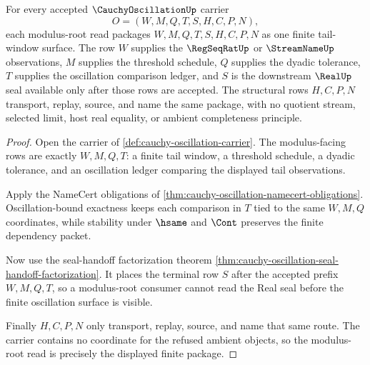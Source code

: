 \begin{theorem}
\label{thm:cauchy-oscillation-modulus-root-package}
For every accepted $\CauchyOscillationUp$ carrier
$$
O=(W,M,Q,T,S,H,C,P,N),
$$
each modulus-root read packages $W,M,Q,T,S,H,C,P,N$ as one finite tail-window surface. The row $W$ supplies the $\RegSeqRatUp$ or $\StreamNameUp$ observations, $M$ supplies the threshold schedule, $Q$ supplies the dyadic tolerance, $T$ supplies the oscillation comparison ledger, and $S$ is the downstream $\RealUp$ seal available only after those rows are accepted. The structural rows $H,C,P,N$ transport, replay, source, and name the same package, with no quotient stream, selected limit, host real equality, or ambient completeness principle.
\end{theorem}
\begin{proof}
Open the carrier of \autoref{def:cauchy-oscillation-carrier}. The modulus-facing rows are exactly $W,M,Q,T$: a finite tail window, a threshold schedule, a dyadic tolerance, and an oscillation ledger comparing the displayed tail observations.

Apply the NameCert obligations of \autoref{thm:cauchy-oscillation-namecert-obligations}. Oscillation-bound exactness keeps each comparison in $T$ tied to the same $W,M,Q$ coordinates, while stability under $\hsame$ and $\Cont$ preserves the finite dependency packet.

Now use the seal-handoff factorization theorem \autoref{thm:cauchy-oscillation-seal-handoff-factorization}. It places the terminal row $S$ after the accepted prefix $W,M,Q,T$, so a modulus-root consumer cannot read the Real seal before the finite oscillation surface is visible.

Finally $H,C,P,N$ only transport, replay, source, and name that same route. The carrier contains no coordinate for the refused ambient objects, so the modulus-root read is precisely the displayed finite package.
\end{proof}

